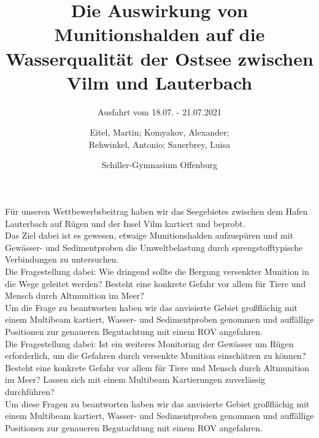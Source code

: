 \documentclass[12pt,titlepage]{scrreprt}
\newcommand{\jens}{Prof. Dr. Jens Greinert }
\begin{document}
% 
\begin{titlepage}

	

\title{Die Auswirkung von Munitionshalden auf die Wasserqualität der Ostsee zwischen Vilm und Lauterbach}
\subtitle{Ausfahrt vom 18.07. - 21.07.2021}
\titlehead{\centering\texttt{[image: Bilder/DSC05220]}}


\author{Eitel, Martin; Komyakov, Alexander; \\ Rehwinkel, Antonio; Sauerbrey, Luisa\\ \and Schiller-Gymnasium Offenburg}

\publishers{Wissenschaftspate: \jens \texttt{jgreinert@geomar.de} \\
\vspace*{2ex} Betreuer: Marek Czernohous \texttt{m.czernohous@schiller-offenburg.de}}

\maketitle

\end{titlepage}
Für unseren Wettbewerbsbeitrag haben wir das Seegebietes zwischen dem Hafen Lauterbach
auf Rügen und der Insel Vilm kartiert und beprobt. \\ Das Ziel dabei ist es gewesen, etwaige Munitionshalden aufzuspüren 
und mit Gewässer- und Sedimentproben die Umweltbelastung durch sprengstofftypische Verbindungen zu untersuchen.
\\ Die Fragestellung dabei: Wie dringend sollte die Bergung versenkter Munition in die Wege geleitet werden?
Besteht eine konkrete Gefahr vor allem für Tiere und Mensch durch Altmunition im Meer? \\ Um die Frage zu beantworten haben wir das anvisierte Gebiet großflächig mit einem Multibeam kartiert, Wasser- und Sedimentproben genommen und auffällige Positionen zur genaueren Begutachtung mit einem ROV angefahren.\\



Die Fragestellung dabei: Ist ein weiteres Monitoring der Gewässer um Rügen erforderlich, um die Gefahren durch versenkte Munition einschätzen zu können? Besteht eine konkrete Gefahr vor allem für Tiere und Mensch durch Altmunition im Meer? Lassen sich mit einem Multibeam Kartierungen zuverlässig durchführen?\\ Um diese Fragen zu beantworten haben wir das anvisierte Gebiet großflächig mit einem Multibeam kartiert, Wasser- und Sedimentproben genommen und auffällige Positionen zur genaueren Begutachtung mit einem ROV angefahren.\\
\end{document}
